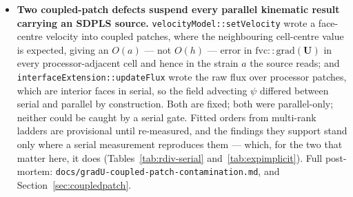 \documentclass[preprint,3p,11pt]{elsarticle}
\newcommand{\psilev}{\psi}
\begin{document}
\begin{itemize}
    i.e.\ at $\phi$, the flux the algebraic source \textbf{R} convects on --- on
    gradient, shape and volume simultaneously (Table~\ref{tab:rdiv-blend}).
    Conservation requires routing the operator through
    $\mathrm{div}(\phi_{\mathbf{w}},\cdot)$ and therefore forces $\lambda \neq
    1$: a single upwind operator, conservation on the normal flux, and the optimal
    convecting flux cannot hold together, and at $\lambda = 1$ the form \emph{is}
    \textbf{R} with the conservation gone.
  \item \textbf{Two coupled-patch defects suspend every parallel kinematic result
    carrying an SDPLS source.} \texttt{velocityModel::setVelocity} wrote a face-centre
    velocity into coupled patches, where the neighbouring cell-centre value is
    expected, giving an $O(a)$ --- not $O(h)$ --- error in
    $\mathrm{fvc::grad}(\mathbf{U})$ in every processor-adjacent cell and hence in
    the strain $a$ the source reads; and \texttt{interfaceExtension::updateFlux}
    wrote the raw flux over processor patches, which are interior faces in serial,
    so the field advecting $\psilev$ differed between serial and parallel by
    construction. Both are fixed; both were parallel-only; neither could be caught
    by a serial gate. Fitted orders from multi-rank ladders are provisional until
    re-measured, and the findings they support stand only where a serial
    measurement reproduces them --- which, for the two that matter here, it does
    (Tables~\ref{tab:rdiv-serial} and~\ref{tab:expimplicit}). Full post-mortem:
    \texttt{docs/gradU-coupled-patch-contamination.md}, and
    Section~\ref{sec:coupledpatch}.
\end{itemize}
\end{document}
